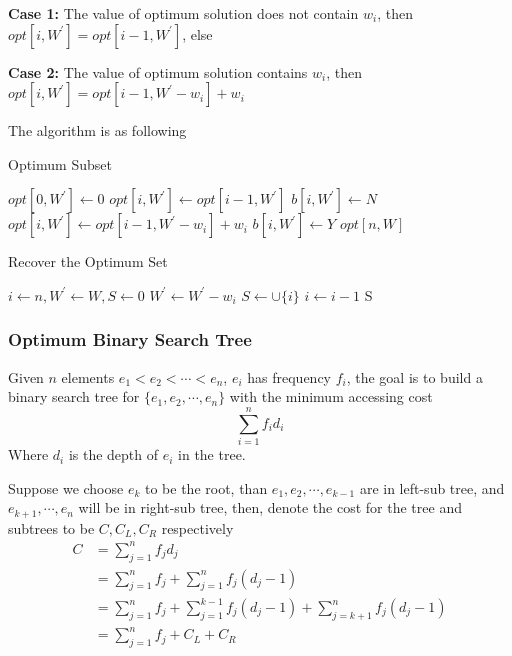 						\textbf{Case 1: }The value of optimum solution does not contain $w_i$, then $opt[i, W^\prime] = opt[i - 1, W^\prime]$, else

						\textbf{Case 2: }The value of optimum solution contains $w_i$, then $opt[i, W^\prime] = opt[i - 1, W^\prime - w_i] + w_i$

						The algorithm is as following
						\begin{algorithm}[h]
							\caption{Optimum Subset}
							\begin{algorithmic}[1]
									\State $opt[0, W^\prime] \gets 0$
								\EndFor
										\State $opt[i, W^\prime] \gets opt[i - 1, W^\prime]$
										\State $b[i, W^\prime] \gets N$
											\State $opt[i, W^\prime] \gets opt[i - 1, W^\prime - w_i] + w_i$
											\State $b[i, W^\prime] \gets Y$
										\EndIf
									\EndFor
								\EndFor
								\State \Return $opt[n, W]$
							\end{algorithmic}
						\end{algorithm}

						\begin{algorithm}[h]
							\caption{Recover the Optimum Set}
							\begin{algorithmic}[1]
								\State $i \gets n, W^\prime \gets W, S \gets 0$
										\State $W^\prime \gets W^\prime - w_i$
										\State $S \gets \cup \{i\}$
									\EndIf
									\State $i \gets i - 1$
								\EndWhile
								\State \Return S
							\end{algorithmic}
						\end{algorithm}

					\subsubsection{Optimum Binary Search Tree}
						Given $n$ elements $e_1 < e_2 < \cdots < e_n$, $e_i$ has frequency $f_i$, the goal is to build a binary search tree for $\{e_1, e_2, \cdots, e_n\}$ with the minimum accessing cost
						\begin{equation}
							\sum_{i = 1}^n f_i d_i
						\end{equation}
						Where $d_i$ is the depth of $e_i$ in the tree.

						Suppose we choose $e_k$ to be the root, than $e_1, e_2, \cdots, e_{k-1}$ are in left-sub tree, and $e_{k+1}, \cdots, e_n$ will be in right-sub tree, then, denote the cost for the tree and subtrees to be $C, C_L, C_R$ respectively
						\begin{align}
							C &= \sum_{j = 1}^n f_j d_j\\
							&= \sum_{j = 1}^n f_j + \sum_{j = 1}^n f_j(d_j - 1)\\
							&= \sum_{j = 1}^n f_j + \sum_{j = 1}^{k - 1} f_j(d_j - 1) + \sum_{j = k + 1}^n f_j(d_j - 1)\\
							&= \sum_{j = 1}^n f_j + C_L + C_R
						\end{align}

